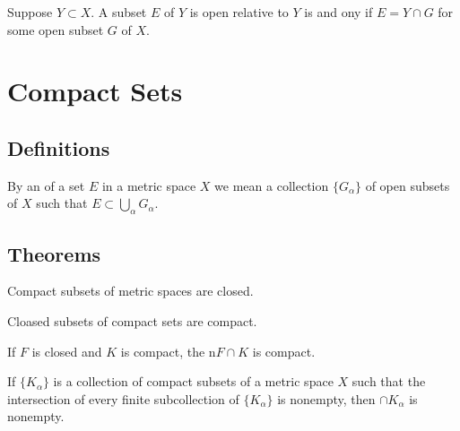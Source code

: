 \begin{thm}
	Suppose $Y \subset X$. A subset $E$ of $Y$ is open relative to $Y$ is and ony if $E = Y \cap G$ for some open subset $G$ of $X$.
\end{thm}

\section{Compact Sets}
\subsection{Definitions}
\begin{deff}
	By an {} of a set $E$ in a metric space $X$ we mean a collection $\{G_\alpha\}$ of open subsets of $X$ such that $E \subset \bigcup_\alpha G_\alpha$.
\end{deff}


\subsection{Theorems}

\begin{thm}
	Compact subsets of metric spaces are closed.
\end{thm}

\begin{thm}
	Cloased subsets of compact sets are compact.
\end{thm}

\begin{thm}
	If $F$ is closed and $K$ is compact, the n$F \cap K$ is compact.
\end{thm}

\begin{thm}
	If $\{K_\alpha\}$ is a collection of compact subsets of a metric space $X$ such that the intersection of every finite subcollection of $\{K_\alpha\}$ is nonempty, then $\cap K_\alpha$ is nonempty.
\end{thm}

